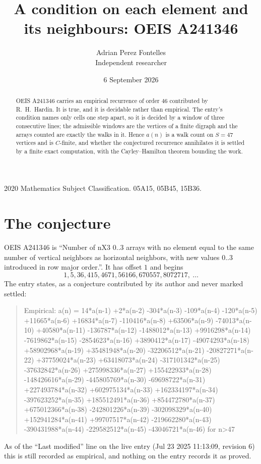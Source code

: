 \documentclass[11pt,a4paper]{article}
\title{A condition on each element and its neighbours: OEIS A241346}
\author{Adrian Perez Fontelles\\ \small Independent researcher}
\date{6 September 2026}
\theoremstyle{plain}
\theoremstyle{definition}
\begin{document}
\maketitle

\begin{abstract}
OEIS A241346 carries an empirical recurrence of order $46$ contributed by R.~H.~Hardin. It is
true, and it is decidable rather than empirical. The entry's condition names only cells one step apart, so it is decided by a window of
three consecutive lines; the
admissible windows are the vertices of a finite digraph and the arrays counted are exactly the
walks in it. Hence $a(n)$ is a walk count on $S=47$ vertices and is $C$-finite, and whether the
conjectured recurrence annihilates it is settled by a finite exact computation, with the
Cayley--Hamilton theorem bounding the work.
\end{abstract}

\noindent\small 2020 Mathematics Subject Classification. 05A15, 05B45, 15B36.\normalsize

\section{The conjecture}

OEIS A241346 is ``Number of nX3 0..3 arrays with no element equal to the same number of vertical neighbors as horizontal neighbors, with new values 0..3 introduced in row major order.''. It has offset $1$ and begins
\[
1, 5, 36, 415, 4671, 56166, 670557, 8072717,\ \dots
\]
The entry states, as a conjecture contributed by its author and never marked settled:
\begin{quote}
Empirical: a(n) = 14*a(n-1) +2*a(n-2) -304*a(n-3) -109*a(n-4) -120*a(n-5) +11665*a(n-6) +16834*a(n-7) -110416*a(n-8) +63506*a(n-9) -74013*a(n-10) +40580*a(n-11) -136787*a(n-12) -1488012*a(n-13) +9916298*a(n-14) -7619862*a(n-15) -2854623*a(n-16) +3890412*a(n-17) -49074293*a(n-18) +58902968*a(n-19) +35481948*a(n-20) -32206512*a(n-21) -20827271*a(n-22) +37759024*a(n-23) +63418073*a(n-24) -317101342*a(n-25) -37632842*a(n-26) +275998336*a(n-27) +155422933*a(n-28) -148426616*a(n-29) -445805769*a(n-30) -69698722*a(n-31) +227493784*a(n-32) +602975134*a(n-33) +162334197*a(n-34) -397623252*a(n-35) +185512491*a(n-36) +854472780*a(n-37) +675012366*a(n-38) -242801226*a(n-39) -302098329*a(n-40) +152941284*a(n-41) +99707517*a(n-42) -219662280*a(n-43) -390431988*a(n-44) -229582512*a(n-45) -43046721*a(n-46) for n>47
\end{quote}
As of the ``Last modified'' line on the live entry (Jul 23 2025 11:13:09, revision 6) this is still
recorded as empirical, and nothing on the entry records it as proved.
\end{document}
